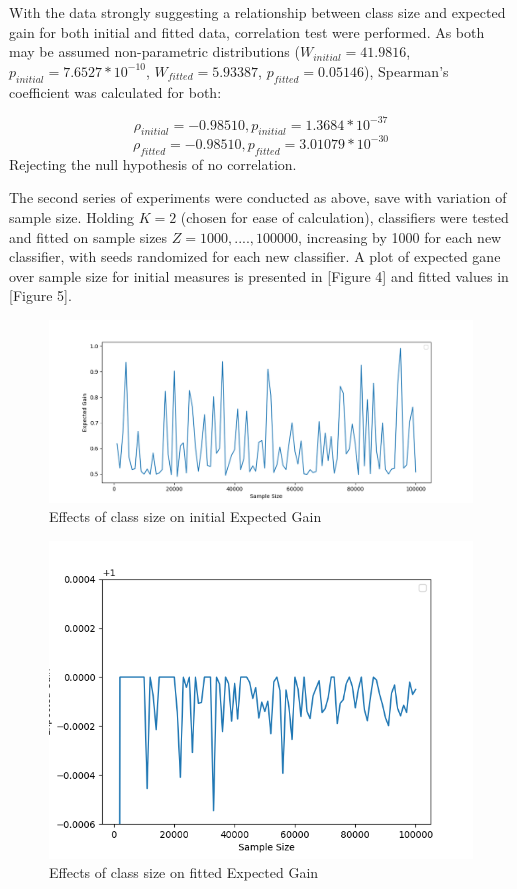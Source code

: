 \documentclass[10pt, conference]{IEEEtran}
\begin{document}
With the data strongly suggesting a relationship between class size and expected gain for both initial and fitted data, correlation test were performed. As both may be assumed non-parametric distributions ($W_{initial}=41.9816$, $p_{initial}=7.6527 * 10^{-10}$, $W_{fitted}=5.93387$, $p_{fitted}=0.05146$), Spearman's coefficient was calculated for both: 

\begin{equation*}
\rho_{initial}=-0.98510, p_{initial}=1.3684 * 10^{-37}
\end{equation*}
\begin{equation*}
\rho_{fitted}=-0.98510, p_{fitted}=3.01079* 10^{-30}
\end{equation*}
Rejecting the null hypothesis of no correlation. 

The second series of experiments were conducted as above, save with variation of sample size. Holding $K=2$ (chosen for ease of calculation), classifiers were tested and fitted on sample sizes $Z=1000, ....,100000$, increasing by 1000 for each new classifier, with seeds randomized for each new classifier. A plot of expected gane over sample size for initial measures is presented in [Figure 4] and fitted values in [Figure 5].
\begin{figure}[htbp]
\centerline{\includegraphics[scale=0.4]{iterativeSampleInitial.png}}
\caption{Effects of class size on initial Expected Gain}
\label{fig}
\end{figure}
\begin{figure}[htbp]
\centerline{\includegraphics[scale=0.5]{iterativeSampleFitted.png}}
\caption{Effects of class size on fitted Expected Gain}
\label{fig}
\end{figure}
\end{document}
